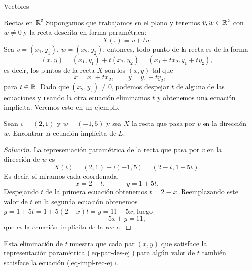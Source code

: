 \begin{chapter}{Vectores}
\begin{section}{Rectas en $\mathbb R^2$}
        Supongamos que trabajamos en el plano y tenemos $v, w \in \mathbb R^2$ con $w \not= 0$ y la recta descrita en forma paramétrica:
        \begin{equation*}
        X(t) =v +tw.
        \end{equation*}
        Sea $v = (x_1,y_1)$, $w = (x_2,y_2)$,  entonces, todo punto de la recta es de la forma
        \begin{equation*}
        (x,y) =(x_1,y_1) +t(x_2,y_2) = (x_1+tx_2,y_1+ty_2),
        \end{equation*}
        es decir, los puntos de la recta $X$ son los $(x,y)$ tal que
        \begin{equation*}
            x = x_1+tx_2, \qquad y = y_1+ty_2, \qquad
        \end{equation*}
        para $t \in \mathbb R$. Dado  que $(x_2,y_2) \ne 0$, podemos despejar $t$  de alguna de las ecuaciones y usando la otra ecuación eliminamos $t$ y obtenemos una ecuación implícita. Veremos esto en un ejemplo.
        
        \begin{ejemplo*}
            Sean $v = (2, 1)$ y $w = (- 1, 5)$ y sea $X$ la recta que pasa por $v$  en la dirección $w$. Encontrar la ecuación  implícita de $L$.
    \end{ejemplo*}
\begin{proof}[Solución]	
            La representación paramétrica de la recta que pasa por  $v$ en la dirección de $w$ es 
            \begin{equation*}
                X(t)= (2,1)+ t(-1,5) = (2-t,1+5t).
            \end{equation*}
             Es decir, si  miramos cada coordenada, 
            \begin{equation}\label{eq-par-des-ej}
            x = 2 - t, \qquad\quad y = 1 + 5t. \qquad\quad\tag{*}
            \end{equation}
            Despejando $t$ de la primera ecuación obtenemos $t = 2-x$. Reemplazando este valor de $t$  en la segunda ecuación obtenemos $y = 1 + 5t=1 + 5(2-x)t= y = 11- 5x$, luego
            \begin{equation}\label{eq-impl-rec-ej}
                5x + y = 11,\tag{**}
            \end{equation}
            que es la ecuación implícita de la recta.
            
            \end{proof}	
            
            Esta eliminación de $t$ muestra que cada par $(x, y)$ que satisface la representación paramétrica (\ref{eq-par-des-ej}) para algún valor de $t$ también satisface la ecuación (\ref{eq-impl-rec-ej}).
            

\end{section}
\end{chapter}
